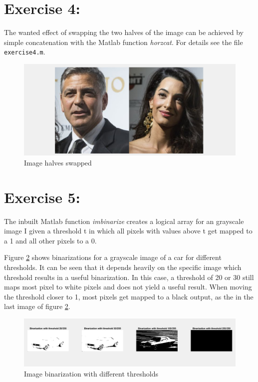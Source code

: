 \documentclass[11pt]{article}
\begin{document}
\section*{Exercise 4:}

The wanted effect of swapping the two halves of the image can be achieved by simple concatenation with the Matlab function \textit{horzcat}. For details see the file \texttt{exercise4.m}.

\begin{figure}[!hbt]
  \includegraphics[width=\textwidth]{task18}
  \caption{Image halves swapped}
  \label{fig:task18}
\end{figure}

\section*{Exercise 5:}

The inbuilt Matlab function \textit{imbinarize} creates a logical array for an grayscale image I given a threshold t in which all pixels with values above t get mapped to a 1 and all other pixels to a 0.

Figure \ref{fig:task19} shows binarizations for a grayscale image of a car for different thresholds. It can be seen that it depends heavily on the specific image which threshold results in a useful binarization. In this case, a threshold of 20 or 30 still maps most pixel to white pixels and does not yield a useful result. When moving the threshold closer to 1, most pixels get mapped to a black output, as the in the last image of figure \ref{fig:task19}.

\begin{figure}[!hbt]
  \includegraphics[width=\textwidth]{task19}
  \caption{Image binarization with different thresholds}
  \label{fig:task19}
\end{figure}
\end{document}
